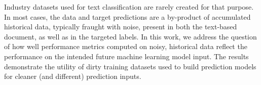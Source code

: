 Industry datasets used for text classification are rarely created for that purpose. In most cases, the data and target predictions are a by-product of accumulated historical data, typically fraught with noise, present in both the text-based document, as well as in the targeted labels. In this work, we address the question of how well performance metrics computed on noisy, historical data reflect the performance on the intended future machine learning model input. The results demonstrate the utility of dirty training datasets used to build prediction models for cleaner (and different) prediction inputs.
